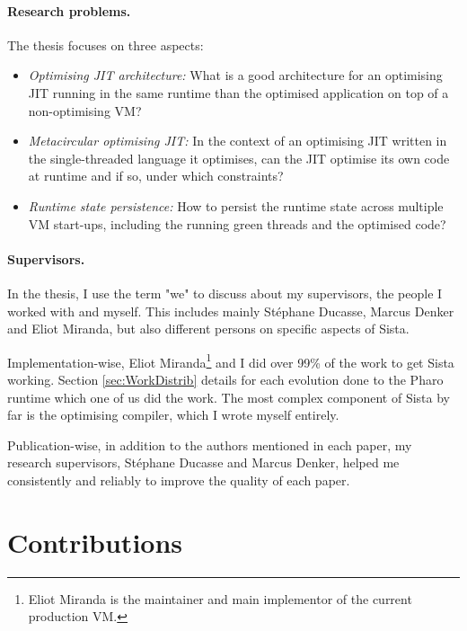 \documentclass[a4paper,12pt,twoside]{../includes/ThesisStyle}
\begin{document}
\paragraph{Research problems.}The thesis focuses on three aspects:
\begin{itemize}
	\item \emph{Optimising JIT architecture:} {What is a good architecture for an optimising JIT running in the same runtime than the optimised application on top of a non-optimising VM?}
	\item \emph{Metacircular optimising JIT:} In the context of an optimising JIT written in the single-threaded language it optimises, can the JIT optimise its own code at runtime and if so, under which constraints?
	\item \emph{Runtime state persistence:} How to persist the runtime state across multiple VM start-ups, including the running green threads and the optimised code?
\end{itemize}

\paragraph{Supervisors.} In the thesis, I use the term "we" to discuss about my supervisors, the people I worked with and myself. This includes mainly St\'ephane Ducasse, Marcus Denker and Eliot Miranda, but also different persons on specific aspects of Sista.

Implementation-wise, Eliot Miranda\footnote{Eliot Miranda is the maintainer and main implementor of the current production VM.} and I did over 99\% of the work to get Sista working. Section \ref{sec:WorkDistrib} details for each evolution done to the Pharo runtime which one of us did the work. The most complex component of Sista by far is the optimising compiler, which I wrote myself entirely.

Publication-wise, in addition to the authors mentioned in each paper, my research supervisors, St\'ephane Ducasse and Marcus Denker, helped me consistently and reliably to improve the quality of each paper.

\section{Contributions}
\end{document}

